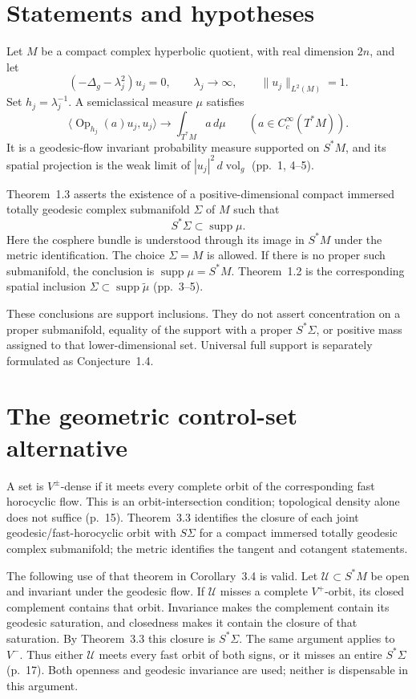 \documentclass[10pt]{article}
\begin{document}
\section*{Statements and hypotheses}
Let \(M\) be a compact complex hyperbolic quotient, with real dimension \(2n\), and let \[(-\Delta_g-\lambda_j^2)u_j=0,\qquad
 \lambda_j\longrightarrow\infty,\qquad
 \|u_j\|_{L^2(M)}=1.\] Set \(h_j=\lambda_j^{-1}\). A semiclassical measure \(\mu\) satisfies \[\langle\operatorname{Op}_{h_j}(a)u_j,u_j\rangle
 \longrightarrow\int_{T^*M}a\,d\mu
 \qquad(a\in C_c^\infty(T^*M)).\] It is a geodesic-flow invariant probability measure supported on \(S^*M\), and its spatial projection is the weak limit of \(|u_j|^2\,d\operatorname{vol}_g\) (pp. 1, 4–5).\par
Theorem 1.3 asserts the existence of a positive-dimensional compact immersed totally geodesic complex submanifold \(\Sigma\) of \(M\) such that \[S^*\Sigma\subset\operatorname{supp}\mu.\] Here the cosphere bundle is understood through its image in \(S^*M\) under the metric identification. The choice \(\Sigma=M\) is allowed. If there is no proper such submanifold, the conclusion is \(\operatorname{supp}\mu=S^*M\). Theorem 1.2 is the corresponding spatial inclusion \(\Sigma\subset\operatorname{supp}\widetilde\mu\) (pp. 3–5).\par
These conclusions are support inclusions. They do not assert concentration on a proper submanifold, equality of the support with a proper \(S^*\Sigma\), or positive mass assigned to that lower-dimensional set. Universal full support is separately formulated as Conjecture 1.4.\par
\section*{The geometric control-set alternative}
A set is \(V^\pm\)-dense if it meets every complete orbit of the corresponding fast horocyclic flow. This is an orbit-intersection condition; topological density alone does not suffice (p. 15). Theorem 3.3 identifies the closure of each joint geodesic/fast-horocyclic orbit with \(S\Sigma\) for a compact immersed totally geodesic complex submanifold; the metric identifies the tangent and cotangent statements.\par
The following use of that theorem in Corollary 3.4 is valid. Let \(\mathcal U\subset S^*M\) be open and invariant under the geodesic flow. If \(\mathcal U\) misses a complete \(V^+\)-orbit, its closed complement contains that orbit. Invariance makes the complement contain its geodesic saturation, and closedness makes it contain the closure of that saturation. By Theorem 3.3 this closure is \(S^*\Sigma\). The same argument applies to \(V^-\). Thus either \(\mathcal U\) meets every fast orbit of both signs, or it misses an entire \(S^*\Sigma\) (p. 17). Both openness and geodesic invariance are used; neither is dispensable in this argument.\par
\end{document}
